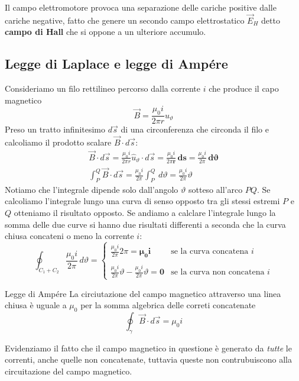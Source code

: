 \documentclass[x11names]{report}
\newcommand{\teorema}[2]{
	\begin{center}
		\fboxsep11pt
		\colorbox{myred}{\begin{minipage}{5.75in}
				\begin{redes}{#1}
					#2
				\end{redes}
		\end{minipage}}
	\end{center}
}
\begin{document}
Il campo elettromotore provoca una separazione delle cariche positive dalle cariche negative, fatto che genere un secondo campo elettrostatico \(\vec{E}_H\) detto \textbf{campo di Hall} che si oppone a un ulteriore accumulo.

\subsection{Legge di Laplace e legge di Ampére}
Consideriamo un filo rettilineo percorso dalla corrente \(i\) che produce  il capo magnetico 
\[
\vec{B} = \frac{\mu_0 i}{2\pi r} \hat{u}_\vartheta
\]
Preso un tratto infinitesimo \(d\vec{s}\) di una circonferenza che circonda il filo e calcoliamo il prodotto scalare \(\vec{B}\cdot d\vec{s}\):
\begin{gather*}
	\vec{B}\cdot d\vec{s} = \frac{\mu_0 i}{2\pi r} \hat{u}_\vartheta \cdot d\vec{s} = \frac{\mu_0 i}{2\pi\boldsymbol{ r}} \, \boldsymbol{ds} = \frac{\mu_0 i}{2\pi} \, \boldsymbol{d\vartheta} \\
	\int_P^Q \vec{B}\cdot d\vec{s} =  \frac{\mu_0 i}{2\pi} \int_P^Q \, d\vartheta =  \frac{\mu_0 i}{2\pi} \vartheta
\end{gather*}
Notiamo che l'integrale dipende solo dall'angolo \(\vartheta\) sotteso all'arco \(PQ\). Se calcoliamo l'integrale lungo una curva di senso opposto tra gli stessi estremi \(P\) e \(Q\) otteniamo il risultato opposto. Se andiamo a calclare l'integrale lungo la somma delle due curve si hanno due risultati differenti a seconda che la curva chiusa concateni o meno la corrente \(i\):
\[
\oint_{C_1 + C_2} \frac{\mu_0 i}{2\pi} \, d\vartheta = 
\left\{\begin{array}{lr}
	\frac{\mu_0 i}{2\pi}2\pi =\boldsymbol{ \mu_0 i} & \text{se la curva concatena } i\\ \\
	\frac{\mu_0 i}{2\pi}\vartheta - \frac{\mu_0 i}{2\pi}\vartheta = \boldsymbol{0} & \text{se la curva non concatena } i
\end{array}\right.
\]

\teorema{Legge di Ampére}{\label{legge ampere}
La circiutazione del campo magnetico attraverso una linea chiusa è uguale a \(\mu_0\) per la somma algebrica delle correti concatenate
\begin{equation}
	\oint_\gamma \vec{B}\cdot d\vec{s} = \mu_0 i
\end{equation}
}
Evidenziamo il fatto che il campo magnetico in questione è generato da \textit{tutte} le correnti, anche quelle non concatenate, tuttavia queste non contrubuiscono alla circuitazione del campo magnetico.
\end{document}
